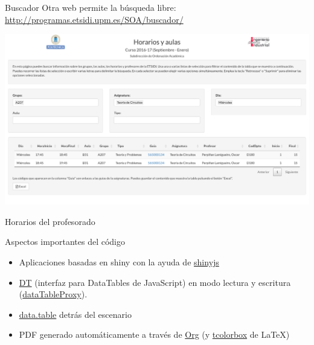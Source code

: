 \documentclass[spanish, xcolor={usenames,svgnames,dvipsnames}]{beamer}
\begin{document}
\begin{frame}[label={sec:orgcd9e5cf}]{Buscador}
Otra web permite la búsqueda libre: \url{http://programas.etsidi.upm.es/SOA/buscador/}
\begin{center}
\includegraphics[width=.9\linewidth]{images/buscador.png}
\end{center}
\end{frame}


\begin{frame}[label={sec:org5a9bc66}]{Horarios del profesorado}
\begin{block}{Aspectos importantes del código}
\begin{itemize}
\item Aplicaciones basadas en shiny con la ayuda de \href{https://daattali.com/shiny/shinyjs-demo/}{shinyjs}
\item \href{https://github.com/Rdatatable/data.table/wiki}{DT} (interfaz para DataTables de JavaScript) en modo lectura y escritura (\href{https://yihui.shinyapps.io/DT-proxy/}{dataTableProxy}).
\item \href{https://github.com/Rdatatable/data.table/wiki}{data.table} detrás del escenario
\item PDF generado automáticamente a través de \href{http://orgmode.org/}{Org} (y \href{https://www.ctan.org/pkg/tcolorbox}{tcolorbox} de \LaTeX{})
\end{itemize}
\end{block}
\end{frame}
\end{document}
